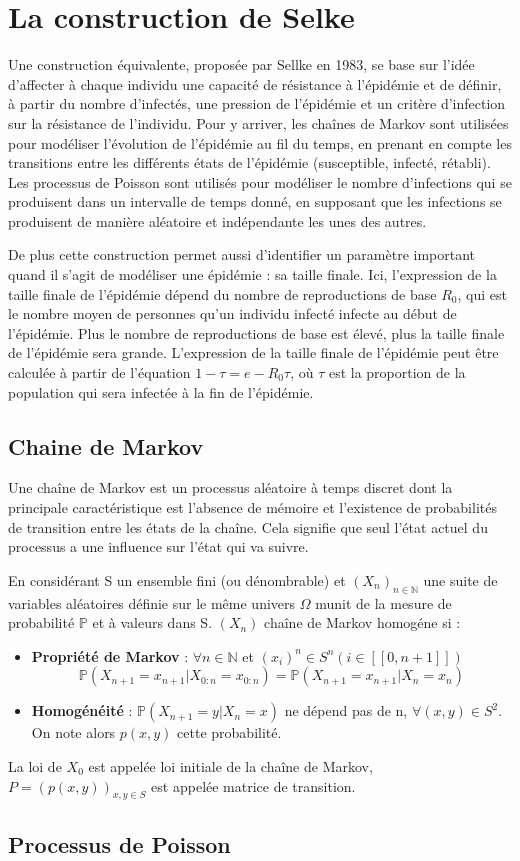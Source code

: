 \section{La construction de Selke}

Une construction équivalente, proposée par Sellke en 1983, se base sur l’idée d’affecter à chaque individu une capacité de résistance à l’épidémie et de définir, à partir du nombre d’infectés, une pression de l’épidémie et un critère d’infection sur la résistance de l’individu. Pour y arriver, les chaînes de Markov sont utilisées pour modéliser l’évolution de l’épidémie au fil du temps, en prenant en compte les transitions entre les différents états de l’épidémie (susceptible, infecté, rétabli). Les processus de Poisson sont utilisés pour modéliser le nombre d’infections qui se produisent dans un intervalle de temps donné, en supposant que les infections se produisent de manière aléatoire et indépendante les unes des autres.

De plus cette construction permet aussi d’identifier un paramètre important quand il s’agit de modéliser une épidémie : sa taille finale. Ici, l’expression de la taille finale de l’épidémie dépend du nombre de reproductions de base $R_0$, qui est le nombre moyen de personnes qu’un individu infecté infecte au début de l’épidémie. Plus le nombre de reproductions de base est élevé, plus la taille finale de l’épidémie sera grande. L’expression de la taille finale de l’épidémie peut être calculée à partir de l’équation $1 - \tau = e - R_0\tau$, où $\tau$ est la proportion de la population qui sera infectée à la fin de l’épidémie.


\subsection{Chaine de Markov}

Une chaîne de Markov est un processus aléatoire à temps discret dont la principale caractéristique est l’absence de mémoire et l’existence de probabilités de transition entre les états de la chaîne. Cela signifie que seul l’état actuel du processus a une influence sur l’état qui va suivre.

En considérant S un ensemble fini (ou dénombrable) et $(X_n)_{n \in \mathbb{N}}$ une suite de variables aléatoires définie sur le même univers $\Omega$ munit de la mesure de probabilité $\mathbb{P}$ et à valeurs dans S. $(X_n)$ chaîne de Markov homogéne si :

\begin{itemize}
    \item \textbf{Propriété de Markov} : $\forall n \in \mathbb{N}$ et $(x_i)^n \in S^n (i \in [[0, n+1]])$ \\
    $$ \mathbb{P}(X_{n+1} = x_{n+1} | X_{0:n} = x_{0:n}) = \mathbb{P}(X_{n+1} = x_{n+1} | X_n = x_n) $$
    \item \textbf{Homogénéité} : $\mathbb{P}(X_{n+1} = y | X_n = x)$ ne dépend pas de n, $\forall (x, y) \in S^2$. On note alors $p(x, y)$ cette probabilité.
\end{itemize}

La loi de $X_0$ est appelée loi initiale de la chaîne de Markov, $P = (p(x, y))_{x,y \in S}$ est appelée matrice de transition.

\subsection{Processus de Poisson}


